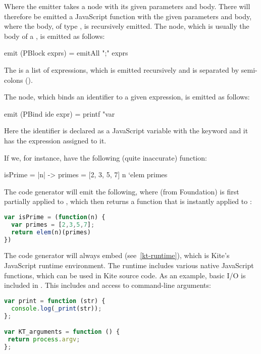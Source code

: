Where the emitter takes a  node with its given parameters and body. There will therefore be emitted a JavaScript function with the given parameters and body, where the body, of type , is recursively emitted. The  node, which is usually the body of a , is emitted as follows:

\begin{haskell}
emit (PBlock exprs) = emitAll ";" exprs
\end{haskell}

The  is a list of expressions, which is emitted recursively and is separated by semi-colons (\code{;}).

The  node, which binds an identifier to a given expression, is emitted as follows:
\begin{haskell}
emit (PBind ide expr) =
  printf "var %
\end{haskell}
Here the identifier is declared as a JavaScript variable with the keyword  and it has the expression assigned to it.

If we, for instance, have the following (quite inaccurate) function:
\begin{kite}
isPrime = |n| -> {
  primes = [2, 3, 5, 7]
  n `elem primes
}
\end{kite}

\newpage

The code generator will emit the following, where  (from Foundation) is first partially applied to , which then returns a function that is instantly applied to :
\begin{lstlisting}[language=Javascript]
var isPrime = (function(n) {
  var primes = [2,3,5,7];
  return elem(n)(primes)
})
\end{lstlisting}

The code generator will always embed  (see~\ref{kt-runtime}), which is Kite's JavaScript runtime environment. The runtime includes various native JavaScript functions, which can be used in Kite source code. As an example, basic I/O is included in . This includes  and access to command-line arguments:
\begin{lstlisting}[language=Javascript]
var print = function (str) {
  console.log(_print(str));
};

var KT_arguments = function () {
 return process.argv;
};
\end{lstlisting}
